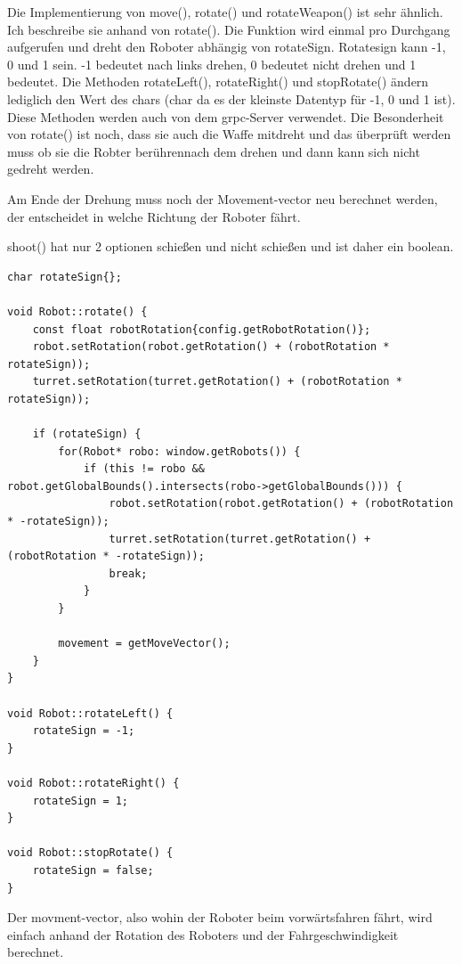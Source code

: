 \documentclass{article}
\begin{document}
Die Implementierung von move(), rotate() und rotateWeapon() ist sehr ähnlich. Ich beschreibe sie anhand von rotate(). Die Funktion wird einmal pro Durchgang aufgerufen und dreht den Roboter abhängig von rotateSign. Rotatesign kann -1, 0 und 1 sein. -1 bedeutet nach links drehen, 0 bedeutet nicht drehen und 1 bedeutet.
Die Methoden rotateLeft(), rotateRight() und stopRotate() ändern lediglich den Wert des chars (char da es der kleinste Datentyp für -1, 0 und 1 ist). Diese Methoden werden auch von dem grpc-Server verwendet. Die Besonderheit von rotate() ist noch, dass sie auch die Waffe mitdreht und das überprüft werden muss ob sie die Robter berührennach dem drehen und dann kann sich nicht gedreht werden.

Am Ende der Drehung muss noch der Movement-vector neu berechnet werden, der entscheidet in welche Richtung der Roboter fährt.

shoot() hat nur 2 optionen schießen und nicht schießen und ist daher ein boolean.

\begin{addmargin}[-3em]{0em}

\begin{verbatim}
char rotateSign{};

void Robot::rotate() {
    const float robotRotation{config.getRobotRotation()};
    robot.setRotation(robot.getRotation() + (robotRotation * rotateSign));
    turret.setRotation(turret.getRotation() + (robotRotation * rotateSign));

    if (rotateSign) {
        for(Robot* robo: window.getRobots()) {
            if (this != robo && robot.getGlobalBounds().intersects(robo->getGlobalBounds())) {
                robot.setRotation(robot.getRotation() + (robotRotation * -rotateSign));
                turret.setRotation(turret.getRotation() + (robotRotation * -rotateSign));
                break;
            }
        }

        movement = getMoveVector();
    }
}

void Robot::rotateLeft() {
    rotateSign = -1;
}

void Robot::rotateRight() {
    rotateSign = 1;
}

void Robot::stopRotate() {
    rotateSign = false;
}
\end{verbatim}

\end{addmargin}

Der movment-vector, also wohin der Roboter beim vorwärtsfahren fährt, wird einfach anhand der Rotation des Roboters und der Fahrgeschwindigkeit berechnet.
\end{document}
